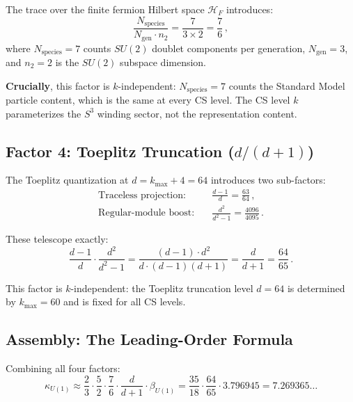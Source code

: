 \documentclass[12pt,a4paper]{article}
\theoremstyle{definition}
\theoremstyle{remark}
\begin{document}
The trace over the finite fermion Hilbert space $\mathcal{H}_F$ introduces:
\begin{equation}
\frac{N_{\mathrm{species}}}{N_{\mathrm{gen}} \cdot n_2}
= \frac{7}{3 \times 2} = \frac{7}{6}\,,
\end{equation}
where $N_{\mathrm{species}} = 7$ counts $SU(2)$ doublet components per
generation, $N_{\mathrm{gen}} = 3$, and $n_2 = 2$ is the $SU(2)$
subspace dimension.

\textbf{Crucially}, this factor is $k$-independent: $N_{\mathrm{species}} = 7$
counts the Standard Model particle content, which is the same at every
CS level.  The CS level $k$ parameterizes the $S^3$ winding sector,
not the representation content.

\subsection{Factor 4: Toeplitz Truncation ($d/(d+1)$)}

The Toeplitz quantization at $d = k_{\max} + 4 = 64$ introduces two
sub-factors:
\begin{align}
\text{Traceless projection:} &\quad \frac{d-1}{d} = \frac{63}{64}\,, \\
\text{Regular-module boost:} &\quad \frac{d^2}{d^2-1} = \frac{4096}{4095}\,.
\end{align}

These telescope exactly:
\begin{equation}
\frac{d-1}{d} \cdot \frac{d^2}{d^2-1}
= \frac{(d-1) \cdot d^2}{d \cdot (d-1)(d+1)}
= \frac{d}{d+1} = \frac{64}{65}\,.
\end{equation}

This factor is $k$-independent: the Toeplitz truncation level $d = 64$
is determined by $k_{\max} = 60$ and is fixed for all CS levels.

\subsection{Assembly: The Leading-Order Formula}

Combining all four factors:
\begin{equation}\label{eq:leading-order}
\boxed{
\kappa_{U(1)} \approx \frac{2}{3} \cdot \frac{5}{2} \cdot \frac{7}{6}
\cdot \frac{d}{d+1} \cdot \beta_{U(1)}
= \frac{35}{18} \cdot \frac{64}{65} \cdot 3.796945
= 7.269365\ldots
}
\end{equation}
\end{document}

